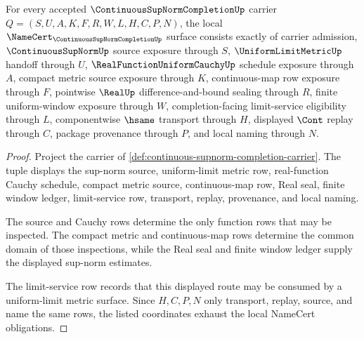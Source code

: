\begin{theorem}
\label{thm:continuous-supnorm-completion-namecert-obligations}
For every accepted $\ContinuousSupNormCompletionUp$ carrier $Q=(S,U,A,K,F,R,W,L,H,C,P,N)$, the local $\NameCert_{\ContinuousSupNormCompletionUp}$ surface consists exactly of carrier admission, $\ContinuousSupNormUp$ source exposure through $S$, $\UniformLimitMetricUp$ handoff through $U$, $\RealFunctionUniformCauchyUp$ schedule exposure through $A$, compact metric source exposure through $K$, continuous-map row exposure through $F$, pointwise $\RealUp$ difference-and-bound sealing through $R$, finite uniform-window exposure through $W$, completion-facing limit-service eligibility through $L$, componentwise $\hsame$ transport through $H$, displayed $\Cont$ replay through $C$, package provenance through $P$, and local naming through $N$.
\end{theorem}
\begin{proof}
Project the carrier of \autoref{def:continuous-supnorm-completion-carrier}. The tuple displays the sup-norm source, uniform-limit metric row, real-function Cauchy schedule, compact metric source, continuous-map row, Real seal, finite window ledger, limit-service row, transport, replay, provenance, and local naming.

The source and Cauchy rows determine the only function rows that may be inspected. The compact metric and continuous-map rows determine the common domain of those inspections, while the Real seal and finite window ledger supply the displayed sup-norm estimates.

The limit-service row records that this displayed route may be consumed by a uniform-limit metric surface. Since $H,C,P,N$ only transport, replay, source, and name the same rows, the listed coordinates exhaust the local NameCert obligations.
\end{proof}

